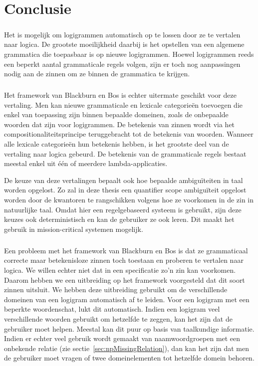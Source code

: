 \chapter{Conclusie}
\label{ch:conclusie}

\paragraph{}Het is mogelijk om logigrammen automatisch op te lossen door ze te vertalen naar logica. De grootste moeilijkheid daarbij is het opstellen van een algemene grammatica die toepasbaar is op nieuwe logigrammen. Hoewel logigrammen reeds een beperkt aantal grammaticale regels volgen, zijn er toch nog aanpassingen nodig aan de zinnen om ze binnen de grammatica te krijgen.

\paragraph{}Het framework van Blackburn en Bos \cite{Blackburn2005, Blackburn2006} is echter uitermate geschikt voor deze vertaling. Men kan nieuwe grammaticale en lexicale categorieën toevoegen die enkel van toepassing zijn binnen bepaalde domeinen, zoals de onbepaalde woorden dat zijn voor logigrammen. De betekenis van zinnen wordt via het compositionaliteitsprincipe teruggebracht tot de betekenis van woorden. Wanneer alle lexicale categorieën hun betekenis hebben, is het grootste deel van de vertaling naar logica gebeurd. De betekenis van de grammaticale regels bestaat meestal enkel uit één of meerdere lambda-applicaties.

De keuze van deze vertalingen bepaalt ook hoe bepaalde ambiguïteiten in taal worden opgelost. Zo zal in deze thesis een quantifier scope ambiguïteit opgelost worden door de kwantoren te rangschikken volgens hoe ze voorkomen in de zin in natuurlijke taal. Omdat hier een regelgebaseerd systeem is gebruikt, zijn deze keuzes ook deterministisch en kan de gebruiker ze ook leren. Dit maakt het gebruik in mission-critical systemen mogelijk.

\paragraph{}Een probleem met het framework van Blackburn en Bos is dat ze grammaticaal correcte maar betekenisloze zinnen toch toestaan en proberen te vertalen naar logica. We willen echter niet dat in een specificatie zo'n zin kan voorkomen. Daarom hebben we een uitbreiding op het framework voorgesteld dat dit soort zinnen uitsluit. We hebben deze uitbreiding gebruikt om de verschillende domeinen van een logigram automatisch af te leiden. Voor een logigram met een beperkte woordenschat, lukt dit automatisch. Indien een logigram veel verschillende woorden gebruikt om hetzelfde te zeggen, kan het zijn dat de gebruiker moet helpen. Meestal kan dit puur op basis van taalkundige informatie. Indien er echter veel gebruik wordt gemaakt van naamwoordgroepen met een onbekende relatie (zie sectie~\ref{sec:npMissingRelation}), dan kan het zijn dat men de gebruiker moet vragen of twee domeinelementen tot hetzelfde domein behoren.
